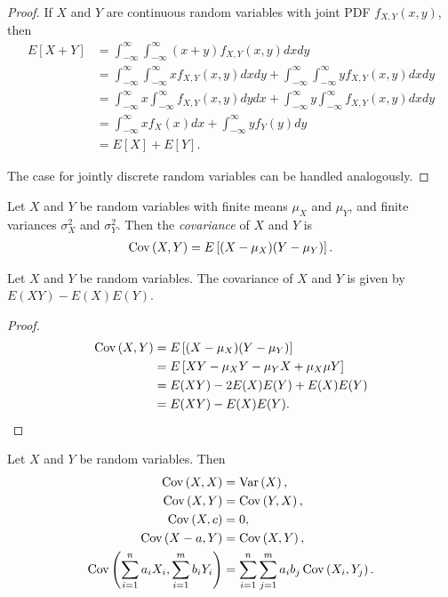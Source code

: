 \begin{proof}
    If $X$ and $Y$ are continuous random variables with joint PDF $f_{X,Y}(x,y)$, then
    \begin{align*}
        E[X + Y] &= \int_{-\infty}^{\infty}\int_{-\infty}^{\infty}\left(x + y\right)f_{X,Y}(x,y)dxdy \\ 
        &= \int_{-\infty}^{\infty}\int_{-\infty}^{\infty}xf_{X,Y}(x,y)dxdy + \int_{-\infty}^{\infty}\int_{-\infty}^{\infty}yf_{X,Y}(x,y)dxdy \\
        &= \int_{-\infty}^{\infty}x\int_{-\infty}^{\infty}f_{X,Y}(x,y)dydx + \int_{-\infty}^{\infty}y\int_{-\infty}^{\infty}f_{X,Y}(x,y)dxdy \\
        &= \int_{-\infty}^{\infty}xf_{X}(x)dx + \int_{-\infty}^{\infty}yf_{Y}(y)dy \\
        &= E[X] + E[Y].
    \end{align*}

    The case for jointly discrete random variables can be handled analogously.
\end{proof}

\begin{defn}
    Let $X$ and $Y$ be random variables with finite means $\mu_{X}$ and $\mu_{Y}$, and finite variances $\sigma_{X}^2$ and $\sigma_{Y}^2$. Then the \emph{covariance} of $X$ and $Y$ is
    \begin{align*}
        \operatorname{Cov}\left(X, Y\right) = E\left[(X - \mu_X)(Y - \mu_Y)\right].
    \end{align*}
\end{defn}

\begin{prop}
    Let $X$ and $Y$ be random variables. The covariance of $X$ and $Y$ is given by $E(XY) - E(X)E(Y)$.
\end{prop}

\begin{proof}
    \begin{align*}
        \operatorname{Cov}\left(X, Y\right) &= E\left[(X - \mu_X)(Y - \mu_Y)\right] \\
        &= E\left[XY - \mu_{X}Y - \mu_{Y}X + \mu_{X}\mu{Y}\right] \\
        &= E(XY) - 2E(X)E(Y) + E(X)E(Y) \\
        &= E(XY) - E(X)E(Y).
    \end{align*}
\end{proof}

\begin{thm}\label{covariance-properties}
    Let $X$ and $Y$ be random variables. Then
    \begin{align*}
        \operatorname{Cov}\left(X, X\right) &= \operatorname{Var}\left(X\right), \\
        \operatorname{Cov}\left(X, Y\right) &= \operatorname{Cov}\left(Y, X\right), \\
        \operatorname{Cov}\left(X, c\right) &= 0, \\
        \operatorname{Cov}\left(X - a, Y\right) &= \operatorname{Cov}\left(X, Y\right), \\
        \operatorname{Cov}\left(\sum_{i=1}^{n}a_iX_i, \sum_{i=1}^{m}b_iY_i\right) &= \sum_{i=1}^{n}\sum_{j=1}^{m}a_ib_j\operatorname{Cov}\left(X_i, Y_j\right).
    \end{align*}
\end{thm}

